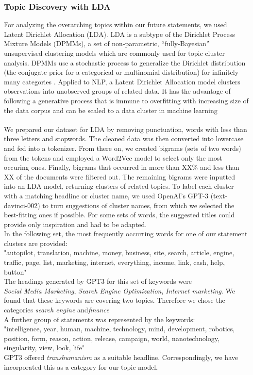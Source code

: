 \subsubsection{Topic Discovery with LDA}
For analyzing the overarching topics within our future statements, we used Latent Dirichlet Allocation (LDA). LDA is a subtype of the Dirichlet Process Mixture Models (DPMMs), a set of non-parametric, “fully-Bayesian” unsupervised clustering models which are commonly used for topic cluster analysis. DPMMs use a stochastic process to generalize the Dirichlet distribution (the conjugate prior for a categorical or multinomial distribution) for infinitely many categories \citep{li2019tutorial}.
Applied to NLP, a Latent Dirichlet Allocation model clusters observations into unobserved groups of related data. It has the advantage of following a generative process that is immune to overfitting with increasing size of the data corpus and can be scaled to a data cluster in machine learning \citep{pritchard2000inference}
\\
\\
We prepared our dataset for LDA by removing punctuation, words with less than three letters and stopwords. The cleaned data was then converted into lowercase and fed into a tokenizer. From there on, we created bigrams (sets of two words) from the tokens and employed a Word2Vec model to select only the most occuring ones.
Finally, bigrams that occurred in more than XX\% and less than XX of the documents were filtered out. The remaining bigrams were inputted into an LDA model, returning clusters of related topics. To label each cluster with a matching headline or cluster name, we used OpenAI’s GPT-3 (text-davinci-002) to turn suggestions of cluster names, from which we selected the best-fitting ones if possible. 
For some sets of words, the suggested titles could provide only inspiration and had to be adapted.
\\
In the following set, the most frequently occurring words for one of our statement clusters are provided:
\\
"autopilot, translation, machine, money, business, site, search, article, engine, traffic, page, list, marketing, internet, everything, income, link, cash, help, button"
\\
The headings generated by GPT3 for this set of keywords were 
\\
\emph{Social Media Marketing}, \emph{Search Engine Optimization}, \emph{Internet marketing}.
We found that these keywords are covering two topics.
Therefore we chose the categories \emph{search engine} and\emph{finance}
\\
A further group of statements was represented by the keywords:
\\
"intelligence, year, human, machine, technology, mind, development, robotics, position, form, reason, action, release, campaign, world, nanotechnology, singularity, view, look, life"
\\
GPT3 offered \emph{transhumanism} as a suitable headline.
Correspondingly, we have incorporated this as a category for our topic model.
